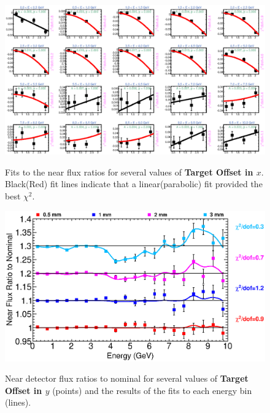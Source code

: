 \begin{figure}[ht]
  \begin{center}
    {\includegraphics[width=5.0in]{figures/TargetXOffset_near_fits.eps}}
  \end{center}
\caption{ Fits to the near flux ratios for several values of {\bf Target Offset in $x$}. Black(Red) fit lines indicate that a linear(parabolic) fit provided the best $\chi^2$. }
\end{figure}

\begin{figure}[ht]
  \begin{center}
    {\includegraphics[width=6.0in]{figures/TargetYOffset_near_summary.eps}}
  \end{center}
\caption{ Near detector flux ratios to nominal for several values of {\bf Target Offset in $y$} (points) and the results of the fits to each energy bin (lines).}
\end{figure}

